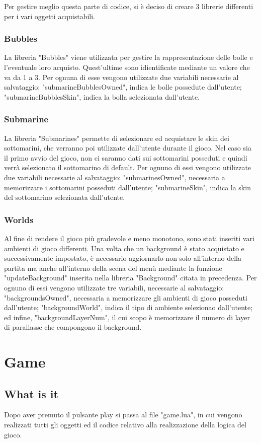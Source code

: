 \documentclass[12pt]{article}
\begin{document}
Per gestire meglio questa parte di codice, si è deciso di creare 3 librerie differenti per i vari oggetti acquistabili.

\subsubsection{Bubbles}
La libreria "Bubbles" viene utilizzata per gestire la rappresentazione delle bolle e l'eventuale loro acquisto. Quest'ultime sono idientificate mediante un valore che va da 1 a 3. 
Per ognuna di esse vengono utilizzate due variabili necessarie al salvataggio: "submarineBubblesOwned", indica le bolle possedute dall'utente; "submarineBubblesSkin", indica la bolla selezionata dall'utente.
\subsubsection{Submarine}
La libreria "Submarines" permette di selezionare ed acquistare le skin dei sottomarini, che verranno poi utilizzate dall'utente durante il gioco. Nel caso sia il primo avvio del gioco, non ci saranno dati sui sottomarini posseduti e quindi verrà selezionato il sottomarino di default. 
Per ognuno di essi vengono utilizzate due variabili necessarie al salvataggio: "submarinesOwned", necessaria a memorizzare i sottomarini posseduti dall'utente; "submarineSkin", indica la skin del sottomarino selezionata dall'utente.
\subsubsection{Worlds}
Al fine di rendere il gioco più gradevole e meno monotono, sono stati inseriti vari ambienti di gioco differenti. 
Una volta che un background è stato acquistato e successivamente impostato, è necessario aggiornarlo non solo all'interno della partita ma anche all'interno della scena del menù mediante la funzione "updateBackground" inserita nella libreria "Background" citata in precedenza. 
Per ognuno di essi vengono utilizzate tre variabili, necessarie al salvataggio: "backgroundsOwned", necessaria a memorizzare gli ambienti di gioco posseduti dall'utente; "backgroundWorld", indica il tipo di ambiente selezionao dall'utente; ed infine, "backgroundLayerNum", il cui scopo è memorizzare il numero di layer di parallasse che compongono il background. 


\section{Game}
\subsection{What is it}
Dopo aver premuto il pulsante play si passa al file "game.lua", in cui vengono realizzati tutti gli oggetti ed il codice relativo 
alla realizzazione della logica del gioco.
\end{document}
